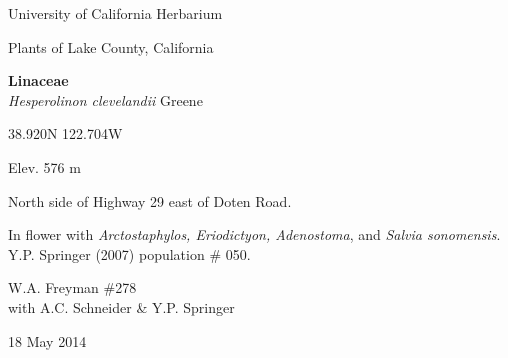 \documentclass[letterpaper,10pt]{article}
\begin{document}
\begin{minipage}[t]{0.40\textwidth}

\begin{center}
University of California Herbarium \\
\begin{large}
Plants of Lake County, California \\
\end{large}
\vspace{\baselineskip}
\textbf{Linaceae} \\
\textit{Hesperolinon clevelandii} Greene\\
\end{center}

\begin{footnotesize}

\begin{multicols}{2}
38.920\textdegree N 122.704\textdegree W
\columnbreak
\begin{flushright}
Elev. 576 m
\end{flushright}
\end{multicols}

North side of Highway 29 east of Doten Road.
\vspace{\baselineskip}

In flower with \textit{Arctostaphylos, Eriodictyon, Adenostoma}, and \textit{Salvia sonomensis}. Y.P. Springer (2007) population \# 050.

\begin{multicols}{2}
W.A. Freyman \#278 \\
with A.C. Schneider \& Y.P. Springer
\columnbreak
\begin{flushright}
18 May 2014
\end{flushright}
\end{multicols}

\end{footnotesize}

\end{minipage}
%
\hspace{2cm}
%
\end{document}
